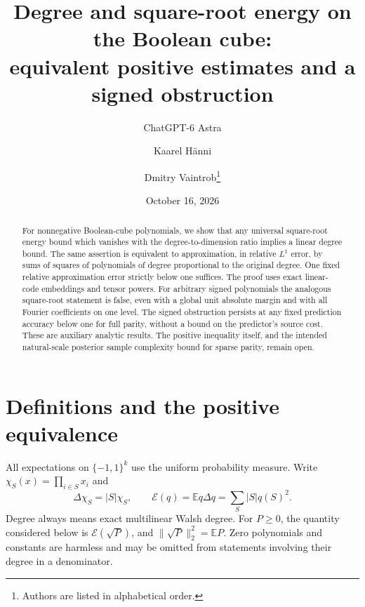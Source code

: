 \documentclass[10pt]{article}
\title{Degree and square-root energy on the Boolean cube:\\
equivalent positive estimates and a signed obstruction}
\author{ChatGPT-6 Astra \and Kaarel H\"anni \and Dmitry Vaintrob\thanks{Authors are listed in alphabetical order.}}
\date{October 16, 2026}
\newcommand{\E}{\mathbb E}
\newcommand{\En}{\mathcal E}
\begin{document}
\maketitle
\begin{abstract}
For nonnegative Boolean-cube polynomials, we show that any universal
square-root energy bound which vanishes with the degree-to-dimension
ratio implies a linear degree bound. The same assertion is equivalent
to approximation, in relative $L^1$ error, by sums of squares of
polynomials of degree proportional to the original degree. One fixed
relative approximation error strictly below one suffices. The proof
uses exact linear-code embeddings and tensor powers. For arbitrary
signed polynomials the analogous square-root statement is false, even
with a global unit absolute margin and with all Fourier coefficients
on one level. The signed obstruction persists at any fixed prediction accuracy below
one for full parity, without a bound on the predictor's source cost.
These are auxiliary analytic results. The positive inequality itself,
and the intended natural-scale posterior sample
complexity bound for sparse parity, remain open.
\end{abstract}

\section{Definitions and the positive equivalence}
All expectations on $\{-1,1\}^k$ use the uniform probability measure.
Write $\chi_S(x)=\prod_{i\in S}x_i$ and
\[
 \Delta\chi_S=|S|\chi_S,\qquad
 \En(q)=\E q\Delta q=\sum_S |S|\widehat q(S)^2.
\]
Degree always means exact multilinear Walsh degree. For $P\ge0$,
the quantity considered below is $\En(\sqrt P)$, and
$\|\sqrt P\|_2^2=\E P$. Zero polynomials and constants are harmless
and may be omitted from statements involving their degree in a denominator.
\end{document}
